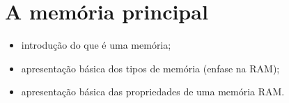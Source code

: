 \section{A memória principal}

    \begin{itemize}
        \item introdução do que é uma memória;
        \item apresentação básica dos tipos de memória 
        (enfase na RAM);
        \item apresentação básica das propriedades de uma 
        memória RAM.
    \end{itemize}